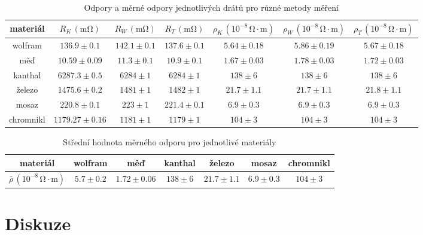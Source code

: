 \documentclass{../concepts/prepareprotokol} %
\begin{document}
\begin{table}[!htbp]
\centering
\caption{Odpory a měrné odpory jednotlivých drátů pro různé metody měření}
\begin{tabular}{c|cccccc}
 \toprule
 materiál & $R_K\, (\mathrm{m\Omega})$ & $R_W\, (\mathrm{m\Omega})$ & $R_T\, (\mathrm{m\Omega})$ & $\rho_K\, (10^{-8} \, \mathrm{\Omega \cdot m})$ & $\rho_W\, (10^{-8} \, \mathrm{\Omega \cdot m})$ & $\rho_T\, (10^{-8} \, \mathrm{\Omega \cdot m})$ \\
 \midrule
 wolfram & $136.9 \pm 0.1$ & $142.1 \pm 0.1$ & $137.6 \pm 0.1$ & $5.64 \pm 0.18$ & $5.86 \pm 0.19$ & $5.67 \pm 0.18$ \\
 měď & $10.59 \pm 0.09$ & $11.3 \pm 0.1$ & $10.9 \pm 0.1$ & $1.67 \pm 0.03$ & $1.78 \pm 0.03$ & $1.72 \pm 0.03$ \\
 kanthal & $6287.3 \pm 0.5$ & $6284 \pm 1$ & $6284 \pm 1$ & $138 \pm 6$ & $138 \pm 6$ & $138 \pm 6$ \\
 železo & $1475.6 \pm 0.2$ & $1481 \pm 1$ & $1482 \pm 1$ & $21.7 \pm 1.1$ & $21.7 \pm 1.1$ & $21.8 \pm 1.1$ \\
 mosaz & $220.8 \pm 0.1$ & $223 \pm 1$ & $221.4 \pm 0.1$ & $6.9 \pm 0.3$ & $6.9 \pm 0.3$ & $6.9 \pm 0.3$ \\
 chromnikl & $1179.27 \pm 0.16$ & $1181 \pm 1$ & $1179 \pm 1$ & $104 \pm 3$ & $104 \pm 3$ & $104 \pm 3$ \\
 \bottomrule
\end{tabular}
\label{tab:rho}
\end{table}

\begin{table}[!hbtp]
\centering
\caption{Střední hodnota měrného odporu pro jednotlivé materiály}
\begin{tabular}{c|cccccc}
 \toprule
 materiál & wolfram & měď & kanthal & železo & mosaz & chromnikl \\
 \midrule
 $\bar{\rho} \, (10^{-8} \, \mathrm{\Omega \cdot m})$ & $5.7 \pm 0.2$ & $1.72 \pm 0.06$ & $138 \pm 6$ & $21.7 \pm 1.1$ & $6.9 \pm 0.3$ & $104 \pm 3$ \\
 \bottomrule
\end{tabular}
\label{tab:meanrho}
\end{table}



\section{Diskuze}
\end{document}
